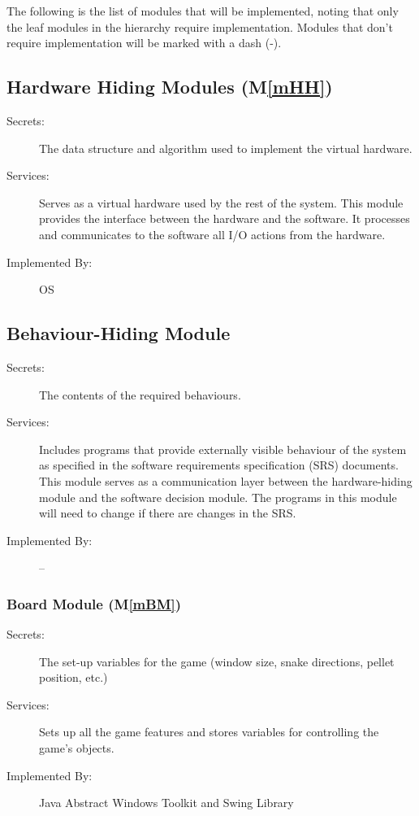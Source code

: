 \documentclass[12pt, titlepage]{article}
\newcommand{\mref}[1]{M\ref{#1}}
\begin{document}
The following is the list of modules that will be implemented, noting that only the leaf modules in the hierarchy require implementation. Modules 
that don't require implementation will be marked with a dash (-). 

\subsection{Hardware Hiding Modules (\mref{mHH})}

\begin{description}
\item[Secrets:]The data structure and algorithm used to implement the virtual
  hardware.
\item[Services:]Serves as a virtual hardware used by the rest of the
  system. This module provides the interface between the hardware and the
  software. It processes and communicates to the software all I/O actions from the hardware.
\item[Implemented By:] OS
\end{description}

\subsection{Behaviour-Hiding Module}

\begin{description}
\item[Secrets:]The contents of the required behaviours.
\item[Services:]Includes programs that provide externally visible behaviour of
  the system as specified in the software requirements specification (SRS)
  documents. This module serves as a communication layer between the
  hardware-hiding module and the software decision module. The programs in this
  module will need to change if there are changes in the SRS.
\item[Implemented By:] --
\end{description}

\subsubsection{Board Module (\mref{mBM})}

\begin{description}
\item[Secrets:]The set-up variables for the game (window size, snake directions, pellet position, etc.)
\item[Services:] Sets up all the game features and stores variables for controlling the game's objects.
\item[Implemented By:] Java Abstract Windows Toolkit and Swing Library
\end{description}
\end{document}
